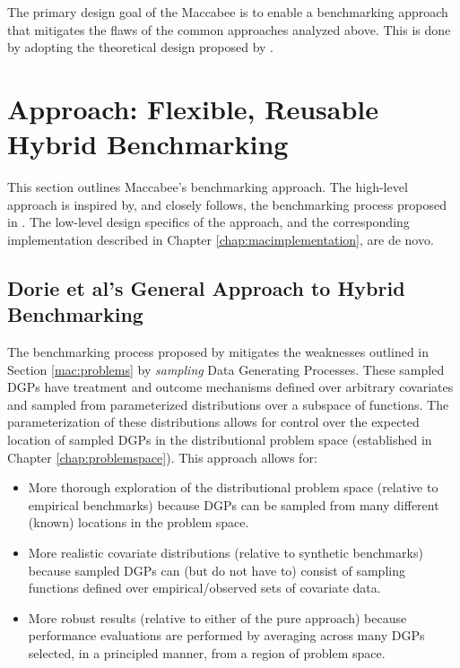 \documentclass[../main.tex]{subfiles}
\begin{document}
\vspace{\baselineskip}

The primary design goal of the Maccabee is to enable a benchmarking approach that mitigates the flaws of the common approaches analyzed above. This is done by adopting the theoretical design proposed by \textcite{Dorie2019Automated1}.

\section{Approach: Flexible, Reusable Hybrid Benchmarking}
\label{mac:approach}

This section outlines Maccabee's benchmarking approach. The high-level approach is inspired by, and closely follows, the benchmarking process proposed in \textcite{Dorie2019Automated1}. The low-level design specifics of the approach, and the corresponding implementation described in Chapter \ref{chap:macimplementation}, are de novo.

\subsection{Dorie et al's General Approach to Hybrid Benchmarking}
\label{mac:generalapproach}

The benchmarking process proposed by \textcite{Dorie2019Automated1} mitigates the weaknesses outlined in Section \ref{mac:problems} by \textit{sampling} Data Generating Processes. These sampled DGPs have treatment and outcome mechanisms defined over arbitrary covariates and sampled from parameterized distributions over a subspace of functions. The parameterization of these distributions allows for control over the expected location of sampled DGPs in the distributional problem space (established in Chapter \ref{chap:problemspace}). This approach allows for:

\begin{itemize}
    \item More thorough exploration of the distributional problem space (relative to empirical benchmarks) because DGPs can be sampled from many different (known) locations in the problem space.

    \item More realistic covariate distributions (relative to synthetic benchmarks) because sampled DGPs can (but do not have to) consist of sampling functions defined over empirical/observed sets of covariate data.

    \item More robust results (relative to either of the pure approach) because performance evaluations are performed by averaging across many DGPs selected, in a principled manner, from a region of problem space.
\end{itemize}
\end{document}
